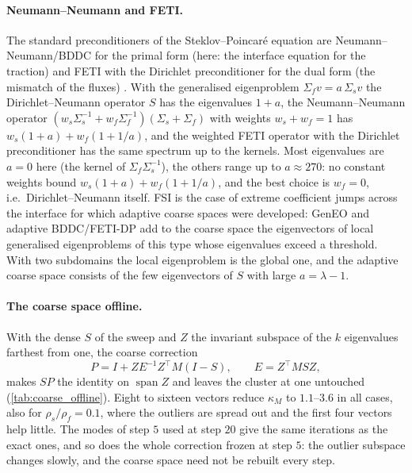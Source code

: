 \documentclass[11pt,a4paper]{article}
\theoremstyle{definition}
\theoremstyle{remark}
\newcommand{\M}{M}
\begin{document}
\paragraph{Neumann--Neumann and FETI.} The standard preconditioners of the Steklov--Poincar\'e
equation are Neumann--Neumann/BDDC for the primal form (here: the interface equation for the
traction) and FETI with the Dirichlet preconditioner for the dual form (the mismatch of the
fluxes) \cite{ToselliWidlund2005}. With the generalised eigenproblem $\Sigma_fv=a\,\Sigma_sv$
the Dirichlet--Neumann operator $S$ has the eigenvalues $1+a$, the Neumann--Neumann operator
$(w_s\Sigma_s^{-1}+w_f\Sigma_f^{-1})(\Sigma_s+\Sigma_f)$ with weights $w_s+w_f=1$ has
$w_s(1+a)+w_f(1+1/a)$, and the weighted FETI operator with the Dirichlet preconditioner has the
same spectrum up to the kernels. Most eigenvalues are $a=0$ here (the kernel of
$\Sigma_f\Sigma_s^{-1}$), the others range up to $a\approx270$: no constant weights bound
$w_s(1+a)+w_f(1+1/a)$, and the best choice is $w_f=0$, i.e.\ Dirichlet--Neumann itself.
FSI is the case of extreme coefficient jumps across the interface for which adaptive coarse
spaces were developed: GenEO \cite{SpillaneEtAl2014} and adaptive BDDC/FETI-DP
\cite{MandelSousedik2007} add to the coarse space the eigenvectors of local generalised
eigenproblems of this type whose eigenvalues exceed a threshold. With two subdomains the local
eigenproblem is the global one, and the adaptive coarse space consists of the few eigenvectors of
$S$ with large $a=\lambda-1$.

\paragraph{The coarse space offline.} With the dense $S$ of the sweep and $Z$ the invariant
subspace of the $k$ eigenvalues farthest from one, the coarse correction
\begin{equation}\label{eq:coarse}
  P=I+ZE^{-1}Z^{\top}\M(I-S),\qquad E=Z^{\top}\M SZ,
\end{equation}
makes $SP$ the identity on $\operatorname{span}Z$ and leaves the cluster at one untouched
(\cref{tab:coarse_offline}). Eight to sixteen vectors reduce $\kappa_{\M}$ to $1.1$--$3.6$ in all
cases, also for $\rho_s/\rho_f=0.1$, where the outliers are spread out and the first four vectors
help little. The modes of step $5$ used at step $20$ give the same iterations as the exact
ones, and so does the whole correction frozen at step $5$: the outlier subspace changes
slowly, and the coarse space need not be rebuilt every step.
\end{document}
